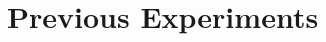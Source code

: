\appendix
\renewcommand{\thechapter}{A}
\renewcommand{\chaptername}{Appendix}

\chapter{Previous Experiments}


